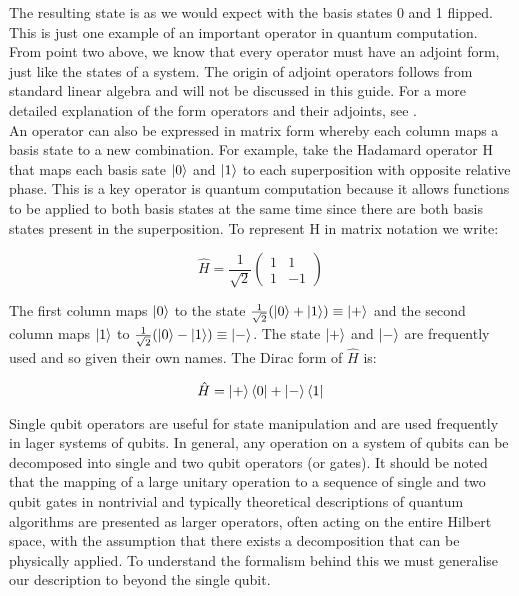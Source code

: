 The resulting state is as we would expect with the basis states 0 and 1 flipped. This is just one example of an important operator in quantum computation. From point two above, we know that every operator must have an adjoint form, just like the states of a system. The origin of adjoint operators follows from standard linear algebra and will not be discussed in this guide. For a more detailed explanation of the form operators and their adjoints, see \cite{nielsen_chuang_2010}. \\

An operator can also be expressed in matrix form whereby each column maps a basis state to a new combination. For example, take the Hadamard operator H that maps each basis sate $\left\vert{0}\right\rangle$ and $\left\vert{1}\right\rangle$ to each superposition with opposite relative phase. This is a key operator is quantum computation because it allows functions to be applied to both basis states at the same time since there are both basis states present in the superposition. To represent H in matrix notation we write:

\begin{equation}
    \hat{H} = \frac{1}{\sqrt{2}}\begin{pmatrix}1 & 1\\
    1 & -1\end{pmatrix}
\end{equation}

The first column maps $\left\vert{0}\right\rangle$ to the state $\frac{1}{\sqrt{2}}(\left\vert{0}\right\rangle+\left\vert{1}\right\rangle)\equiv\left\vert{+}\right\rangle$ and the second column maps $\left\vert{1}\right\rangle$ to $\frac{1}{\sqrt{2}}(\left\vert{0}\right\rangle-\left\vert{1}\right\rangle)\equiv\left\vert{-}\right\rangle$. The state $\left\vert{+}\right\rangle$ and $\left\vert{-}\right\rangle$ are frequently used and so given their own names. The Dirac form of $\hat{H}$ is:

\begin{equation}
    \hat{H}=\left\vert{+}\right\rangle\left\langle{0}\right\vert+\left\vert{-}\right\rangle\left\langle{1}\right\vert
\end{equation}

Single qubit operators are useful for state manipulation and are used frequently in lager systems of qubits. In general, any operation on a system of qubits can be decomposed into single and two qubit operators (or gates). It should be noted that the mapping of a large unitary operation to a sequence of single and two qubit gates in nontrivial and typically theoretical descriptions of quantum algorithms are presented as larger operators, often acting on the entire Hilbert space, with the assumption that there exists a decomposition  that can be physically applied. To understand the formalism behind this we must generalise our description to beyond the single qubit.

